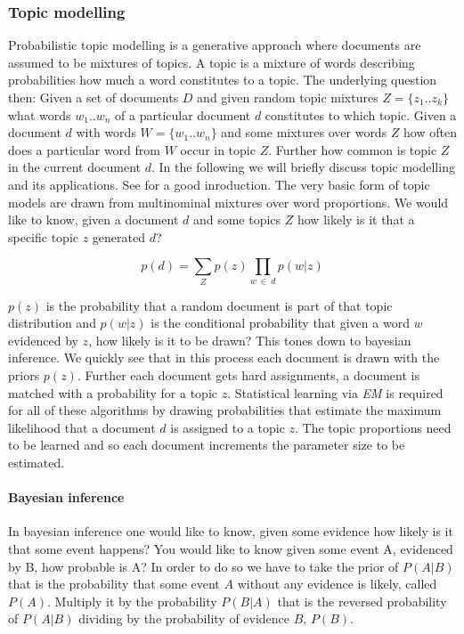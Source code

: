       \subsubsection{Topic modelling}
      \label{sec:topic_modelling}

        Probabilistic topic modelling is a generative approach where documents are assumed to be mixtures of topics. A topic is a mixture of words describing probabilities how much a word constitutes to a topic. The underlying question then: Given a set of documents $D$ and given random topic mixtures $Z=\{z_1..z_k\}$ what words $w_1..w_n$ of a particular document $d$ constitutes to which topic. Given a document $d$ with words $W=\{w_1..w_n\}$ and some mixtures over words $Z$ how often does a particular word from $W$ occur in topic $Z$. Further how common is topic $Z$ in the current document $d$. In the following we will briefly discuss topic modelling and its applications. See \cite{TopicModelsBlei2012} for a good inroduction. The very basic form of topic models are drawn from multinominal mixtures over word proportions. We would like to know, given a document $d$ and some topics $Z$ how likely is it that a specific topic $z$ generated $d$?

          \begin{equation}
            p(d) = \sum_{Z} p(z) \prod_{w\:\in\:d}p(w|z)
          \end{equation}

        $p(z)$ is the probability that a random document is part of that topic distribution and $p(w|z)$ is the conditional probability that given a word $w$ evidenced by $z$, how likely is it to be drawn? This tones down to bayesian inference. We quickly see that in this process each document is drawn with the priors $p(z)$. Further each document gets hard assignments, a document is matched with a probability for a topic $z$. Statistical learning via \emph{EM} is required for all of these algorithms by drawing probabilities that estimate the maximum likelihood that a document $d$ is assigned to a topic $z$. The topic proportions need to be learned and so each document increments the parameter size to be estimated.

        \paragraph{Bayesian inference}
          In bayesian inference one would like to know, given some evidence how likely is it that some event happens? You would like to know given some event A, evidenced by B, how probable is A? In order to do so we have to take the prior of $P(A|B)$ that is the probability that some event $A$ without any evidence is likely, called $P(A)$. Multiply it by the probability $P(B|A)$ that is the reversed probability of $P(A|B)$ dividing by the probability of evidence $B$, $P(B)$.

